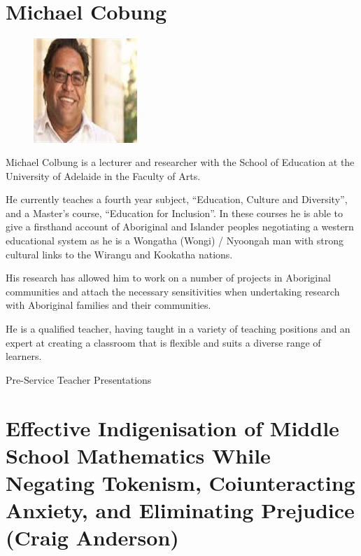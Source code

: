 \documentclass[twoside,14pt,a4paper,notitlepage]{memoir}
\begin{document}
\clearpage{}
\vspace*{2cm}
\section*{Michael Cobung}

\begin{figure}
\centering
\includegraphics[width=0.35\textwidth]{michael_colbung.jpeg}
\end{figure}

Michael Colbung is a lecturer and researcher with the School of Education at the University of Adelaide in the Faculty of Arts. 

He currently teaches a fourth year subject, “Education, Culture and Diversity”, and a Master’s course, “Education for Inclusion”. In these courses he is able to give a firsthand account of Aboriginal and Islander peoples negotiating a western educational system as he is a Wongatha (Wongi) / Nyoongah man with strong cultural links to the Wirangu and Kookatha nations.

His research has allowed him to work on a number of projects in Aboriginal communities and attach the necessary sensitivities when undertaking research with Aboriginal families and their communities.

He is a qualified teacher, having taught in a variety of teaching positions and an expert at creating a classroom that is flexible and suits a diverse range of learners.
\vfill



\clearpage{}
\vspace*{2cm}
{\Huge Pre-Service Teacher Presentations}
\vspace{2cm}

\section*{Effective Indigenisation of Middle School Mathematics While Negating Tokenism, Coiunteracting Anxiety, and Eliminating Prejudice (Craig Anderson)}
\label{aut:anderson}
\end{document}

